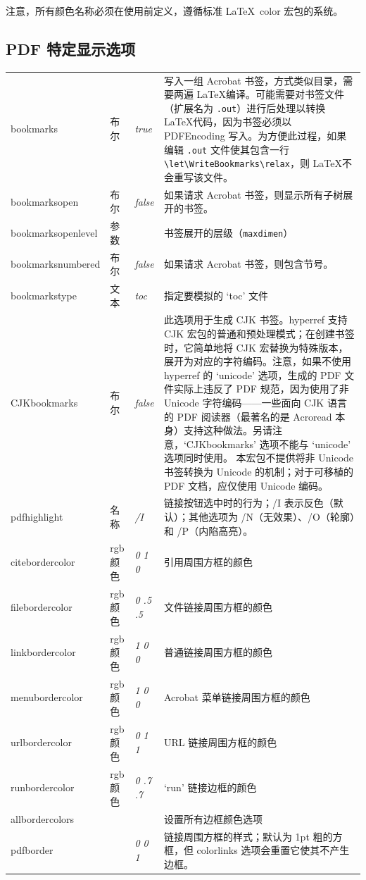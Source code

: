 \documentclass{article}
\newcommand*{\xpackage}[1]{\textsf{#1}}
\newcommand{\bs}{\symbol{'134}}%
\newcommand{\ci}[1]{\texttt{\bs#1}}
\begin{document}
注意，所有颜色名称必须在使用前定义，遵循标准
\LaTeX\ \xpackage{color} 宏包的系统。

\subsection{PDF 特定显示选项}
\begin{longtable}{@{}>{\ttfamily}ll>{\itshape}lp{7.6cm}@{}}
bookmarks          & 布尔   & true   & 写入一组 Acrobat 书签，方式类似目录，需要两遍 \LaTeX 编译。可能需要对书签文件（扩展名为 \texttt{.out}）进行后处理以转换 \LaTeX 代码，因为书签必须以 PDFEncoding 写入。为方便此过程，如果编辑 \texttt{.out} 文件使其包含一行 \verb|\let\WriteBookmarks\relax|，则 \LaTeX 不会重写该文件。\\
bookmarksopen      & 布尔   & false   & 如果请求 Acrobat 书签，则显示所有子树展开的书签。\\
bookmarksopenlevel & 参数   &         & 书签展开的层级（\ci{maxdimen}）\\
bookmarksnumbered  & 布尔   & false   & 如果请求 Acrobat 书签，则包含节号。\\
bookmarkstype      & 文本   & toc     & 指定要模拟的 `toc' 文件\\
CJKbookmarks       & 布尔   & false   &
    此选项用于生成 CJK 书签。\xpackage{hyperref} 支持 \xpackage{CJK} 宏包的普通和预处理模式；在创建书签时，它简单地将 CJK 宏替换为特殊版本，展开为对应的字符编码。注意，如果不使用 \xpackage{hyperref} 的 `unicode' 选项，生成的 PDF 文件实际上违反了 PDF 规范，因为使用了非 Unicode 字符编码——一些面向 CJK 语言的 PDF 阅读器（最著名的是 Acroread 本身）支持这种做法。另请注意，`CJKbookmarks' 选项不能与 `unicode' 选项同时使用。
    本宏包不提供将非 Unicode 书签转换为 Unicode 的机制；对于可移植的 PDF 文档，应仅使用 Unicode 编码。\\
pdfhighlight       & 名称   & /I      & 链接按钮选中时的行为；/I 表示反色（默认）；其他选项为 /N（无效果）、/O（轮廓）和 /P（内陷高亮）。\\
citebordercolor    & rgb 颜色 & 0 1 0   & 引用周围方框的颜色\\
filebordercolor    & rgb 颜色 & 0 .5 .5 & 文件链接周围方框的颜色\\
linkbordercolor    & rgb 颜色 & 1 0 0   & 普通链接周围方框的颜色\\
menubordercolor    & rgb 颜色 & 1 0 0   & Acrobat 菜单链接周围方框的颜色\\
urlbordercolor     & rgb 颜色 & 0 1 1   & URL 链接周围方框的颜色\\
runbordercolor     & rgb 颜色 & 0 .7 .7 & `run' 链接边框的颜色\\
allbordercolors    &        &         & 设置所有边框颜色选项\\
pdfborder          &        & 0 0 1   & 链接周围方框的样式；默认为 1pt 粗的方框，但 colorlinks 选项会重置它使其不产生边框。
\end{longtable}
\end{document}
